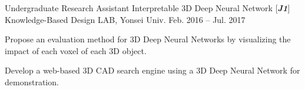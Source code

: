 \begin{cventries}



\cventry
{Undergraduate Research Assistant} %
{Interpretable 3D Deep Neural Network [\textit{\textbf{J1}}]} %
{Knowledge-Based Design LAB, Yonsei Univ.} %
{Feb. 2016 – Jul. 2017} %
{ %
\begin{cvitems}
\item {Propose an evaluation method for 3D Deep Neural Networks by visualizing the impact of each voxel of each 3D object.}
\item {Develop a web-based 3D CAD search engine using a 3D Deep Neural Network for demonstration.}
\end{cvitems}
}


\end{cventries}

